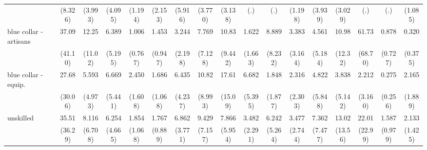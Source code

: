 {\begin{tabular}{l*{16}{c}}
                    &     (8.326)         &     (3.993)         &     (4.095)         &     (1.194)         &     (2.153)         &     (5.916)         &     (3.770)         &     (3.138)         &         (.)         &         (.)         &     (1.198)         &     (3.939)         &     (3.029)         &         (.)         &         (.)         &     (1.085)         \\
[1em]
blue collar - artisans&       37.09\sym{**} &       12.25\sym{**} &       6.389\sym{*}  &       1.006         &       1.453         &       3.244         &       7.769\sym{*}  &       10.83\sym{**} &       1.622         &       8.889\sym{*}  &       3.383         &       4.561         &       10.98\sym{*}  &       61.73\sym{***}&       0.878         &       0.320         \\
                    &     (41.10)         &     (11.02)         &     (5.195)         &     (0.767)         &     (0.947)         &     (2.198)         &     (7.128)         &     (9.442)         &     (1.663)         &     (8.232)         &     (3.164)         &     (5.184)         &     (12.32)         &     (68.70)         &     (0.727)         &     (0.375)         \\
[1em]
blue collar - equip.&       27.68\sym{**} &       5.593         &       6.669\sym{*}  &       2.450         &       1.686         &       6.435\sym{**} &       10.82\sym{**} &       17.61\sym{***}&       6.682\sym{*}  &       1.848         &       2.316         &       4.822         &       3.838         &       2.212         &       0.275         &       2.165         \\
                    &     (30.06)         &     (4.973)         &     (5.441)         &     (1.608)         &     (1.068)         &     (4.237)         &     (8.993)         &     (15.09)         &     (5.395)         &     (1.877)         &     (2.303)         &     (5.848)         &     (5.142)         &     (3.160)         &     (0.256)         &     (1.889)         \\
[1em]
unskilled           &       35.51\sym{***}&       8.116\sym{*}  &       6.254\sym{*}  &       1.854         &       1.767         &       6.862\sym{***}&       9.429\sym{**} &       7.866\sym{**} &       3.482         &       6.242\sym{*}  &       3.477         &       7.362\sym{*}  &       13.02\sym{*}  &       22.01\sym{**} &       1.587         &       2.133         \\
                    &     (36.29)         &     (6.708)         &     (4.665)         &     (1.068)         &     (0.889)         &     (3.771)         &     (7.157)         &     (5.954)         &     (2.291)         &     (5.264)         &     (2.744)         &     (7.477)         &     (13.56)         &     (22.99)         &     (0.979)         &     (1.425)         \\

\end{tabular}}
